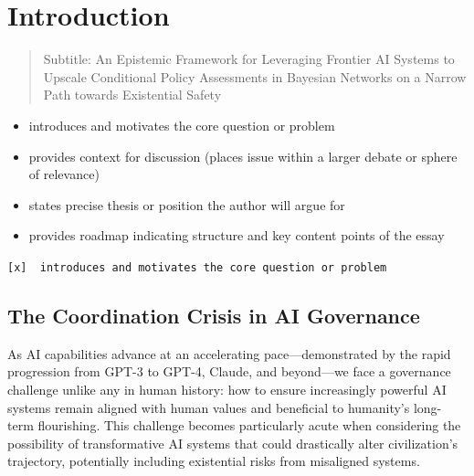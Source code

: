 \documentclass[
  11pt,
  letterpaper,
]{book}
\begin{document}

\chapter{Introduction}\label{sec-introduction}

\begin{quote}
Subtitle: An Epistemic Framework for Leveraging Frontier AI Systems to
Upscale Conditional Policy Assessments in Bayesian Networks on a Narrow
Path towards Existential Safety
\end{quote}

\begin{tcolorbox}[enhanced jigsaw, colbacktitle=quarto-callout-note-color!10!white, toprule=.15mm, coltitle=black, opacityback=0, colback=white, bottomtitle=1mm, title=\textcolor{quarto-callout-note-color}{\faInfo}\hspace{0.5em}{10\% of Grade: \textasciitilde{} 14\% of text \textasciitilde{} 4200
words \textasciitilde{} 10 pages}, rightrule=.15mm, bottomrule=.15mm, breakable, arc=.35mm, toptitle=1mm, leftrule=.75mm, titlerule=0mm, left=2mm, opacitybacktitle=0.6, colframe=quarto-callout-note-color-frame]

\begin{itemize}
\item
  introduces and motivates the core question or problem
\item
  provides context for discussion (places issue within a larger debate
  or sphere of relevance)
\item
  states precise thesis or position the author will argue for
\item
  provides roadmap indicating structure and key content points of the
  essay
\end{itemize}

\end{tcolorbox}

\texttt{{[}x{]}\ \ introduces\ and\ motivates\ the\ core\ question\ or\ problem}

\section{The Coordination Crisis in AI
Governance}\label{sec-coordination-crisis}

As AI capabilities advance at an accelerating pace---demonstrated by the
rapid progression from GPT-3 to GPT-4, Claude, and beyond---we face a
governance challenge unlike any in human history: how to ensure
increasingly powerful AI systems remain aligned with human values and
beneficial to humanity's long-term flourishing. This challenge becomes
particularly acute when considering the possibility of transformative AI
systems that could drastically alter civilization's trajectory,
potentially including existential risks from misaligned systems.
\end{document}
